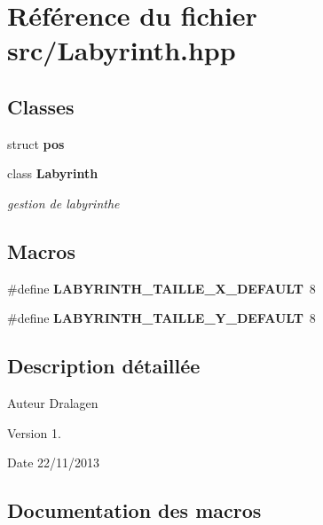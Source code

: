 \section{Référence du fichier src/\-Labyrinth.hpp}
\label{_labyrinth_8hpp}
\subsection*{Classes}
\begin{DoxyCompactItemize}
\item 
struct {\bf pos}
\item 
class {\bf Labyrinth}
\begin{DoxyCompactList}\small\item\em gestion de labyrinthe \end{DoxyCompactList}\end{DoxyCompactItemize}
\subsection*{Macros}
\begin{DoxyCompactItemize}
\item 
\#define {\bf L\-A\-B\-Y\-R\-I\-N\-T\-H\-\_\-\-T\-A\-I\-L\-L\-E\-\_\-\-X\-\_\-\-D\-E\-F\-A\-U\-L\-T}~8
\item 
\#define {\bf L\-A\-B\-Y\-R\-I\-N\-T\-H\-\_\-\-T\-A\-I\-L\-L\-E\-\_\-\-Y\-\_\-\-D\-E\-F\-A\-U\-L\-T}~8
\end{DoxyCompactItemize}


\subsection{Description détaillée}
\begin{DoxyAuthor}{Auteur}
Dralagen 
\end{DoxyAuthor}
\begin{DoxyVersion}{Version}
1. 
\end{DoxyVersion}
\begin{DoxyDate}{Date}
22/11/2013 
\end{DoxyDate}


\subsection{Documentation des macros}
